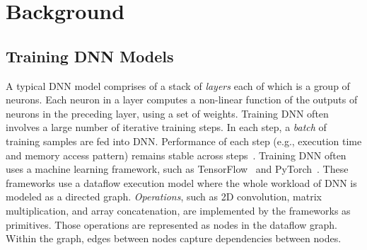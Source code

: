 \section{Background}
\label{sec:bg}

\vspace{-2pt}
\subsection{Training DNN Models}
\vspace{-1pt}
\label{sec:bg_training}

A typical DNN model comprises of a stack of \textit{layers} each of which is a group of neurons. Each neuron in a layer computes a non-linear function of the outputs of neurons in the preceding layer, using a set of weights. Training DNN often involves a large number of iterative training steps. In each step, a \textit{batch} of training samples are fed into DNN. Performance of each step (e.g., execution time and memory access pattern) remains stable across steps~\cite{liu:micro18,ipdps19_liu,DBLP:conf/asplos/SivathanuCSZ19}. %
Training DNN often uses a machine learning framework, such as TensorFlow~\cite{tensorflow2015-whitepaper} and  PyTorch~\cite{pytorch}. %
These frameworks use a dataflow execution model where the whole workload of DNN is modeled as a directed graph. 
\textit{Operations}, such as 2D convolution, matrix multiplication, and array concatenation, are implemented by the frameworks as primitives. Those operations are represented as nodes in the dataflow graph. Within the graph, edges between nodes capture dependencies between nodes. 


